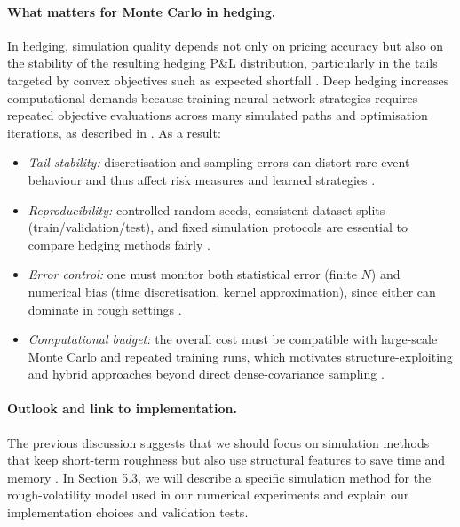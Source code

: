 \documentclass[12pt,a4paper]{article}
\theoremstyle{definition}
\theoremstyle{plain}
\theoremstyle{remark}
\theoremstyle{plain}
\begin{document}
\paragraph{What matters for Monte Carlo in hedging.}
In hedging, simulation quality depends not only on pricing accuracy but also on the stability of the resulting hedging P\&L distribution, particularly in the tails targeted by convex objectives such as expected shortfall \cite{Buehler2019DeepHedging}. Deep hedging increases computational demands because training neural-network strategies requires repeated objective evaluations across many simulated paths and optimisation iterations, as described in \cite{Buehler2019DeepHedging,Horvath2021DeepRough}. As a result:
\begin{itemize}
\item \emph{Tail stability:} discretisation and sampling errors can distort rare-event behaviour and thus affect risk measures and learned strategies \cite{Buehler2019DeepHedging,BayerFriz2016}.
\item \emph{Reproducibility:} controlled random seeds, consistent dataset splits (train/validation/test), and fixed simulation protocols are essential to compare hedging methods fairly \cite{Buehler2019DeepHedging,Horvath2021DeepRough}.
\item \emph{Error control:} one must monitor both statistical error (finite $N$) and numerical bias (time discretisation, kernel approximation), since either can dominate in rough settings \cite{BayerFriz2016,Horvath2021DeepRough}.
\item \emph{Computational budget:} the overall cost must be compatible with large-scale Monte Carlo and repeated training runs, which motivates structure-exploiting and hybrid approaches beyond direct dense-covariance sampling \cite{Buehler2019DeepHedging,BayerFriz2016}.
\end{itemize}

\paragraph{Outlook and link to implementation.}
The previous discussion suggests that we should focus on simulation methods that keep short-term roughness but also use structural features to save time and memory \cite{BayerFriz2016}. In Section 5.3, we will describe a specific simulation method for the rough-volatility model used in our numerical experiments and explain our implementation choices and validation tests.
\end{document}
